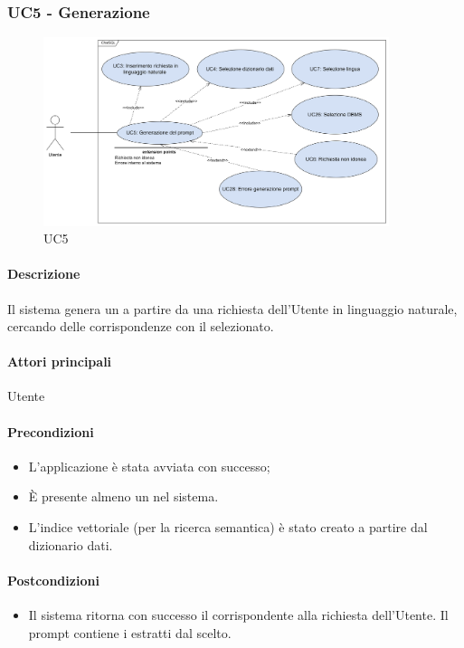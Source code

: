 \subsubsection{UC5 - Generazione }\label{UC5}

\begin{figure}[H]
  \centering
  \includegraphics[width=0.90\textwidth]{assets/uc5.png}
  \caption{UC5}
\end{figure}

\paragraph*{Descrizione}
Il sistema genera un  a partire da una richiesta dell'Utente in linguaggio naturale, cercando delle corrispondenze con il  selezionato.

\paragraph*{Attori principali}
Utente

\paragraph*{Precondizioni}
\begin{itemize}
  \item L'applicazione è stata avviata con successo;
  \item È presente almeno un  nel sistema.
  \item L'indice vettoriale (per la ricerca semantica) è stato creato a partire dal dizionario dati.
\end{itemize}

\paragraph*{Postcondizioni}
\begin{itemize}
  \item Il sistema ritorna con successo il  corrispondente alla richiesta dell'Utente. Il prompt contiene i  estratti dal  scelto.
\end{itemize}

